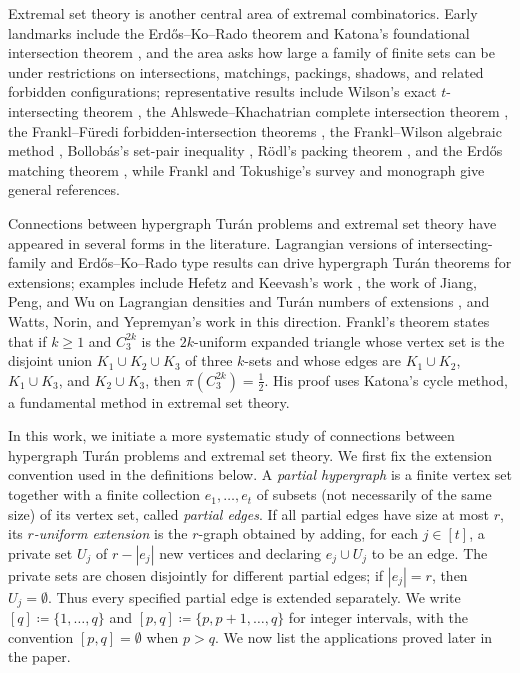 \documentclass[10pt,a4paper]{article}
\theoremstyle{plain}
\theoremstyle{definition}
\theoremstyle{plain}
\begin{document}
Extremal set theory is another central area of extremal combinatorics.  Early landmarks include the Erd\H{o}s--Ko--Rado theorem \cite{EKR61} and Katona's foundational intersection theorem \cite{Katona64}, and the area asks how large a family of finite sets can be under restrictions on intersections, matchings, packings, shadows, and related forbidden configurations; representative results include Wilson's exact $t$-intersecting theorem \cite{Wilson84}, the Ahlswede--Khachatrian complete intersection theorem \cite{AhlswedeKhachatrian97}, the Frankl--F\"uredi forbidden-intersection theorems \cite{FranklFuredi85}, the Frankl--Wilson algebraic method \cite{FranklWilson81}, Bollob\'as's set-pair inequality \cite{Bollobas65}, R\"odl's packing theorem \cite{Rodl85}, and the Erd\H{o}s matching theorem \cite{ErdosMatching65}, while Frankl and Tokushige's survey \cite{FranklTokushige16} and monograph \cite{FranklTokushige18} give general references.


Connections between hypergraph Tur\'an problems and extremal set theory have appeared in several forms in the literature.  Lagrangian versions of intersecting-family and Erd\H{o}s--Ko--Rado type results can drive hypergraph Tur\'an theorems for extensions; examples include Hefetz and Keevash's work \cite{HefetzKeevash13}, the work of Jiang, Peng, and Wu on Lagrangian densities and Tur\'an numbers of extensions \cite{JiangPengWu18}, and Watts, Norin, and Yepremyan's work \cite{WattsNorinYepremyan19} in this direction.  Frankl's theorem \cite{Frankl90} states that if $k\ge1$ and $C^{2k}_3$ is the $2k$-uniform expanded triangle whose vertex set is the disjoint union $K_1\cup K_2\cup K_3$ of three $k$-sets and whose edges are $K_1\cup K_2$, $K_1\cup K_3$, and $K_2\cup K_3$, then $\pi(C^{2k}_3)=\frac12$.
His proof \cite{Frankl90} uses Katona's cycle method, a fundamental method in extremal set theory.


In this work, we initiate a more systematic study of connections between hypergraph Tur\'an problems and extremal set theory.  We first fix the extension convention used in the definitions below.  A \emph{partial hypergraph} is a finite vertex set together with a finite collection $e_1,\ldots,e_t$ of subsets (not necessarily of the same size) of its vertex set, called \emph{partial edges}.  If all partial edges have size at most $r$, its \emph{$r$-uniform extension} is the $r$-graph obtained by adding, for each $j\in[t]$, a private set $U_j$ of $r-|e_j|$ new vertices and declaring $e_j\cup U_j$ to be an edge.  The private sets are chosen disjointly for different partial edges; if $|e_j|=r$, then $U_j=\emptyset$.  Thus every specified partial edge is extended separately.
We write $[q]\coloneqq\{1,\ldots,q\}$ and $[p,q]\coloneqq\{p,p+1,\ldots,q\}$ for integer intervals, with the convention $[p,q]=\emptyset$ when $p>q$.  We now list the applications proved later in the paper.
\end{document}
